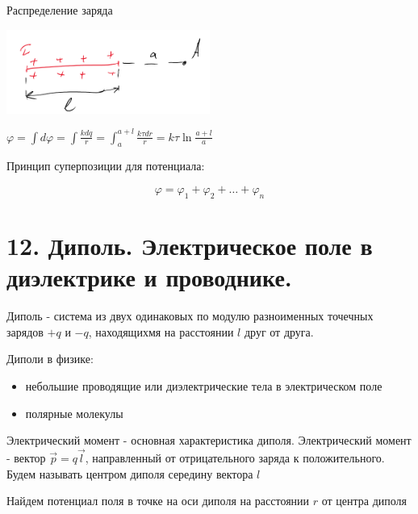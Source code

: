 \documentclass[12pt]{article}
\begin{document}
 Распределение заряда 

\begin{center}
    \includegraphics[width=0.5\textwidth]{physics1/images/physics1_2024_11_25_5}
\end{center}

$\varphi = \int d\varphi = \int \frac{kdq}{r} = \int_a^{a + l} \frac{k\tau dr}{r} = k\tau \ln\frac{a + l}{a}$

\mediumvspace

Принцип суперпозиции для потенциала:

\[\varphi = \varphi_1 + \varphi_2 + \dots + \varphi_n\]












\section{12. Диполь. Электрическое поле в диэлектрике и проводнике.}

\Def Диполь - система из двух одинаковых по модулю разноименных точечных зарядов $+q$ и $-q$, 
находящихмя на расстоянии $l$ друг от друга.

Диполи в физике:

\begin{itemize}
    \item небольшие проводящие или диэлектрические тела в электрическом поле

    \item полярные молекулы
\end{itemize}

Электрический момент - основная характеристика диполя. Электрический момент - вектор $\vec{p} = q\vec{l}$, 
направленный от отрицательного заряда к положительного. Будем называть центром диполя середину вектора $l$ 

 Найдем потенциал поля в точке на оси диполя на расстоянии $r$ от центра диполя
\end{document}
